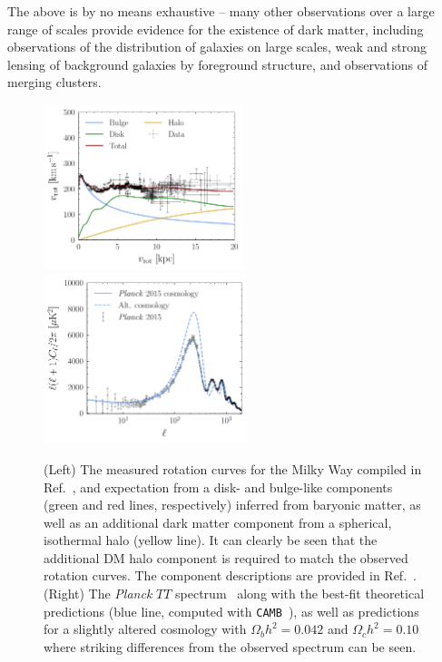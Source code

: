 The above is by no means exhaustive -- many other observations over a large range of scales provide evidence for the existence of dark matter, including observations of the distribution of galaxies on large scales, weak and strong lensing of background galaxies by foreground structure, and observations of merging clusters.

\begin{figure}[htbp] 
\hspace{-0.9 cm} 
\includegraphics[width=0.5185\textwidth]{ch-intro/rotcurves.pdf}
 \includegraphics[width=0.528\textwidth]{ch-intro/cells.pdf}  
\caption{(Left) The measured rotation curves for the Milky Way compiled in Ref.~\cite{2009PASJ...61..227S}, and expectation from a disk- and bulge-like components (green and red lines, respectively) inferred from baryonic matter, as well as an additional dark matter component from a spherical, isothermal halo (yellow line). It can clearly be seen that the additional DM halo component is required to match the observed rotation curves. The component descriptions are provided in Ref.~\cite{2009PASJ...61..227S}. (Right) The \emph{Planck} $TT$ spectrum~\cite{Ade:2015xua} along with the best-fit theoretical predictions (blue line, computed with \texttt{CAMB}~\cite{Lewis:1999bs}), as well as predictions for a slightly altered cosmology with $\Omega_b h^2= 0.042$ and $\Omega_c h^2=0.10$ where striking differences from the observed spectrum can be seen.}  
\label{fig:evidence}
\end{figure}


